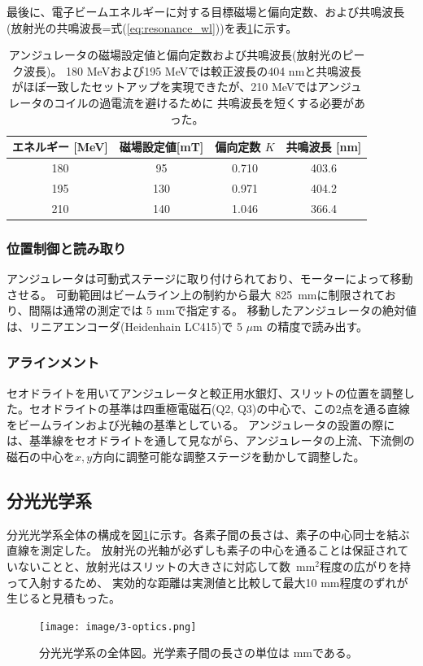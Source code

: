 \documentclass[a4paper,11pt,uplatex]{jsbook}
\begin{document}
最後に、電子ビームエネルギーに対する目標磁場と偏向定数、および共鳴波長(放射光の共鳴波長=式(\ref{eq:resonance_wl}))を表\ref{undulator_setting}に示す。
\begin{table}[H]
  \centering
  \begin{tabular}{c|ccc}
    エネルギー [MeV]& 磁場設定値[mT]&偏向定数 $K$&共鳴波長 [nm]\\ \hline
    180 & 95  & 0.710 & 403.6\\
    195 & 130 & 0.971 & 404.2\\
    210 & 140 & 1.046 & 366.4\\
  \end{tabular}
  \caption[アンジュレータの磁場設定値]{アンジュレータの磁場設定値と偏向定数および共鳴波長(放射光のピーク波長)。
  180 MeVおよび195 MeVでは較正波長の404 nmと共鳴波長がほぼ一致したセットアップを実現できたが、210 MeVではアンジュレータのコイルの過電流を避けるために
  共鳴波長を短くする必要があった。}\label{undulator_setting}
\end{table}

\subsubsection{位置制御と読み取り}
アンジュレータは可動式ステージに取り付けられており、モーターによって移動させる。
可動範囲はビームライン上の制約から最大 825~mmに制限されており、間隔は通常の測定では 5 mmで指定する。
移動したアンジュレータの絶対値は、リニアエンコーダ(Heidenhain LC415)で 5 $\mu \text{m}$ の精度で読み出す。

\subsubsection{アラインメント}
セオドライトを用いてアンジュレータと較正用水銀灯、スリットの位置を調整した。セオドライトの基準は四重極電磁石(Q2, Q3)の中心で、この2点を通る直線をビームラインおよび光軸の基準としている。
アンジュレータの設置の際には、基準線をセオドライトを通して見ながら、アンジュレータの上流、下流側の磁石の中心を$x,y$方向に調整可能な調整ステージを動かして調整した。

\subsection{分光光学系}
分光光学系全体の構成を図\ref{fig:optics}に示す。各素子間の長さは、素子の中心同士を結ぶ直線を測定した。
放射光の光軸が必ずしも素子の中心を通ることは保証されていないことと、放射光はスリットの大きさに対応して数~mm$^2$程度の広がりを持って入射するため、
実効的な距離は実測値と比較して最大10 mm程度のずれが生じると見積もった。
\begin{figure}[h]
  \centering
  \texttt{[image: image/3-optics.png]}\\
  \caption[分光光学系の全体図]{分光光学系の全体図。光学素子間の長さの単位は mmである。}
  \label{fig:optics}
\end{figure}
\end{document}
